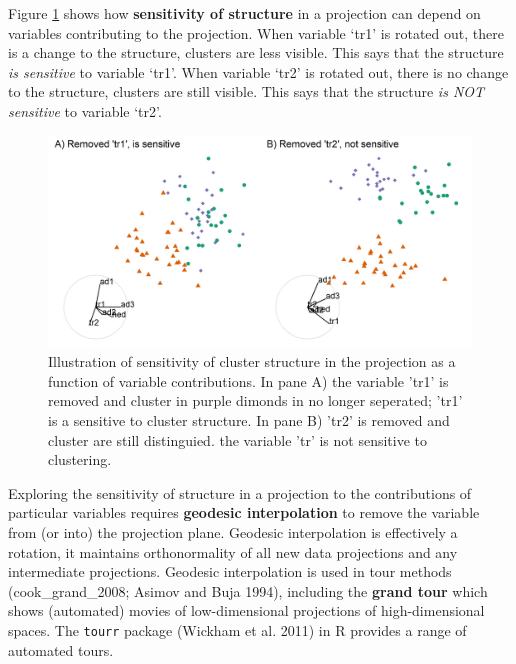 \documentclass[
  11,
]{article}
\begin{document}
Figure \ref{fig:basisStructure} shows how \textbf{sensitivity of structure} in a projection can depend on variables contributing to the projection. When variable `tr1' is rotated out, there is a change to the structure, clusters are less visible. This says that the structure \emph{is sensitive} to variable `tr1'. When variable `tr2' is rotated out, there is no change to the structure, clusters are still visible. This says that the structure \emph{is NOT sensitive} to variable `tr2'.

\begin{figure}[h]

{\centering \includegraphics[width=1\linewidth,]{./figures/basisStructure} 

}

\caption{Illustration of sensitivity of cluster structure in the projection as a function of variable contributions. In pane A) the variable 'tr1' is removed and cluster in purple dimonds in no longer seperated; 'tr1' is a sensitive to cluster structure. In pane B) 'tr2' is removed and cluster are still distinguied. the variable 'tr' is not sensitive to clustering.}\label{fig:basisStructure}
\end{figure}

Exploring the sensitivity of structure in a projection to the contributions of particular variables requires \textbf{geodesic interpolation} to remove the variable from (or into) the projection plane. Geodesic interpolation is effectively a rotation, it maintains orthonormality of all new data projections and any intermediate projections. Geodesic interpolation is used in tour methods (cook\_grand\_2008; Asimov and Buja 1994), including the \textbf{grand tour} which shows (automated) movies of low-dimensional projections of high-dimensional spaces. The \texttt{tourr} package (Wickham et al. 2011) in R provides a range of automated tours.
\end{document}
